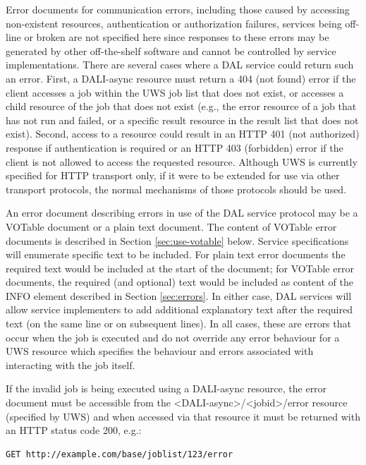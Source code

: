 \documentclass[11pt,letter]{ivoa}
\begin{document}
Error documents for communication errors, including those caused by accessing 
non-existent resources, authentication or authorization failures, services being 
off-line or broken are not specified here since responses to these errors may be 
generated by other off-the-shelf software and cannot be controlled by service 
implementations. There are several cases where a DAL service could return such 
an error. First, a DALI-async resource must return a 404 (not found) error if 
the client accesses a job within the UWS job list that does not exist, or 
accesses a child resource of the job that does not exist (e.g., the error 
resource of a job that has not run and failed, or a specific result resource in 
the result list  that does not exist). Second, access to a resource could result 
in an HTTP 401 (not authorized) response if authentication is required or an 
HTTP 403 (forbidden) error if the client is not allowed to access the requested 
resource. Although UWS is currently specified for HTTP transport only, if it 
were to be extended for use via other transport protocols, the normal mechanisms 
of those protocols should be used.

An error document describing errors in use of the DAL service protocol may be a 
VOTable document \citep{std:VOTABLE} or a plain text document. 
The content of 
VOTable error documents is described in Section \ref{sec:use-votable} below. Service 
specifications will enumerate specific text to be included. For plain text error 
documents the required text would be included at the start of the document; for 
VOTable error documents, the required (and optional) text would be included as 
content of the INFO element described in Section \ref{sec:errors}. In either case, DAL 
services will allow service implementers to add additional explanatory text 
after the required text (on the same line or on subsequent lines). In all cases, 
these are errors that occur when the job is executed and do not override any 
error behaviour for a UWS resource which specifies the behaviour and errors 
associated with interacting with the job itself.

If the invalid job is being executed using a DALI-async resource, the error 
document must be accessible from the <DALI-async>/<jobid>/error resource 
(specified by UWS) and when accessed via that resource it must be returned with 
an HTTP status code 200, e.g.:

\begin{verbatim}
GET http://example.com/base/joblist/123/error
\end{verbatim}
\end{document}
